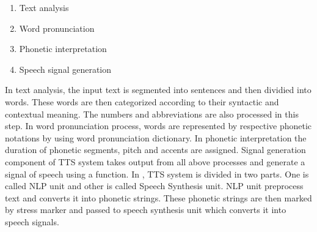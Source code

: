 \begin{enumerate}
  \item Text analysis
  \item Word pronunciation
  \item Phonetic interpretation
  \item Speech signal generation
\end{enumerate}

In text analysis, the input text is segmented into sentences and then dividied into words. These words are then categorized according to their syntactic and contextual meaning. The numbers and abbreviations are also processed in this step. In word pronunciation process, words are represented by respective phonetic notations by using word pronunciation dictionary. In phonetic interpretation the duration of phonetic segments, pitch and accents are assigned. Signal generation component of TTS system takes output from all above processes and generate a signal of speech using a function. In \cite{urdu_text_preprocessing}, TTS system is divided in two parts. One is called NLP unit and other is called Speech Synthesis unit. NLP unit preprocess text and converts it into phonetic strings. These phonetic strings are then marked by stress marker and passed to speech synthesis unit which converts it into speech signals.